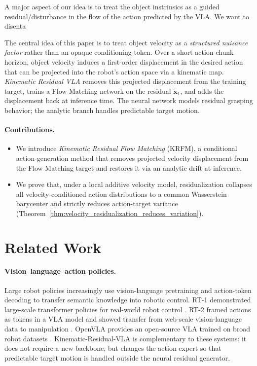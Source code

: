 \documentclass[10pt,twocolumn,letterpaper]{article}
\begin{document}
A major aspect of our idea is to treat the object instrinsics as a guided residual/disturbance in the flow of the action predicted by the VLA. We want to disenta

The central idea of this paper is to treat object velocity as a \emph{structured nuisance factor} rather than an opaque conditioning token. Over a short action-chunk horizon, object velocity induces a first-order displacement in the desired action that can be projected into the robot's action space via a kinematic map. \emph{Kinematic Residual VLA} removes this projected displacement from the training target, trains a Flow Matching network on the residual $\widetilde{\mathbf x}_1$, and adds the displacement back at inference time. The neural network models residual grasping behavior; the analytic branch handles predictable target motion.

\paragraph{Contributions.}
\begin{itemize}
    \item We introduce \emph{Kinematic Residual Flow Matching} (KRFM), a conditional action-generation method that removes projected velocity displacement from the Flow Matching target and restores it via an analytic drift at inference.
    \item We prove that, under a local additive velocity model, residualization collapses all velocity-conditioned action distributions to a common Wasserstein barycenter and strictly reduces action-target variance (Theorem~\ref{thm:velocity_residualization_reduces_variation}).

\end{itemize}

\section{Related Work}
\label{sec:related}

\paragraph{Vision--language--action policies.}
Large robot policies increasingly use vision-language pretraining and action-token decoding to transfer semantic knowledge into robotic control. RT-1 demonstrated large-scale transformer policies for real-world robot control \citep{brohan2023rt1}. RT-2 framed actions as tokens in a VLA model and showed transfer from web-scale vision-language data to manipulation \citep{zitkovich2023rt2}. OpenVLA provides an open-source VLA trained on broad robot datasets \citep{kim2024openvla}. Kinematic-Residual-VLA is complementary to these systems: it does not require a new backbone, but changes the action expert so that predictable target motion is handled outside the neural residual generator.
\end{document}
